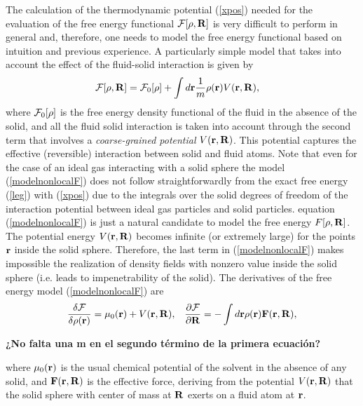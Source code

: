 \documentclass[b5paper,openright,10pt]{book}
\newcommand{\Note}[1]{{\bf \color{red}#1}}    %
\begin{document}
The calculation of the thermodynamic potential (\ref{xpos}) needed for
the evaluation of the free  energy functional ${\cal F}[\rho,{\bf R}]$
is very difficult  to perform in general and,  therefore, one needs to  model the
free energy functional based on intuition and previous experience. A
particularly simple model that takes into account the effect of the
fluid-solid interaction is given by
\begin{align}
  {\cal F}[\rho,{\bf R}]&={\cal F}_0[\rho]
+\int d{\bf r}\frac{1}{m}
\rho({\bf r})V({\bf r},{\bf R}),
\label{modelnonlocalF}
\end{align}
where ${\cal F}_0[\rho]$ is the  free energy density functional of the
fluid in the absence of the solid, and all the fluid solid interaction
is  taken  into  account  through  the second  term  that  involves  a
\textit{coarse-grained   potential}   $V({\bf  r},{\bf   R})$.    This
potential  captures  the  effective (reversible)  interaction  between
solid and fluid atoms.  Note  that even for the case of
  an   ideal  gas   interacting  with   a  solid   sphere  the   model
  (\ref{modelnonlocalF})  does not  follow  straightforwardly from  the
  exact free energy (\ref{leg}) with (\ref{xpos}) due to the integrals
  over  the solid  degrees  of freedom  of  the interaction  potential
  between    ideal     gas    particles    and     solid    particles.
  equation (\ref{modelnonlocalF}) is just a natural  candidate to model the free
  energy $F[\rho,{\bf R}]$. The potential energy $V({\bf r},{\bf R})$
becomes infinite (or extremely large)  for the points ${\bf r}$ inside
the solid  sphere. Therefore, the last  term in (\ref{modelnonlocalF})
makes impossible the realization of density fields with nonzero value
inside the solid sphere (i.e.  leads to impenetrability of the solid).
The derivatives of the free energy model (\ref{modelnonlocalF}) are
\begin{align}
    \frac{\delta{\cal F}}{\delta\rho({\bf r})}=\mu_0({\bf r})+V({\bf r},{\bf R}),&&
    \frac{\partial{\cal F}}{\partial{\bf R}}=-\int d{\bf r}\rho({\bf r}){\bf F}({\bf r},{\bf R}),
\end{align}

\Note{¿No falta una m en el segundo término de la primera ecuación?}

where $\mu_0({\bf r})$ is the  usual chemical potential of the solvent
in the  absence of any  solid, and ${\bf  F}({\bf r},{\bf R})$  is the
effective force, deriving from the potential $V({\bf r},{\bf R})$ that
the solid sphere  with center of mass  at ${\bf R}$ exerts  on a fluid
atom at ${\bf r}$.
\end{document}
